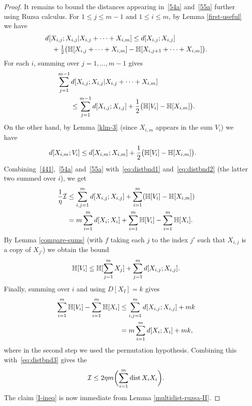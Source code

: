 \begin{proof}
It remains to bound the distances appearing in~\eqref{54a} and~\eqref{55a} further using Ruzsa calculus.
For $1 \leq j \leq m-1$ and $1 \leq i \leq m$, by Lemma \ref{first-useful} we have
\begin{align*} &d[ X_{i,j}; X_{i,j}| X_{i,j}+\cdots+X_{i,m}]
\leq d[X_{i,j}; X_{i,j}] \\
&\quad + \tfrac{1}{2} \bigl(\mathbb{H}[X_{i,j}+\cdots+X_{i,m}] - \mathbb{H}[X_{i,{j+1}}+\cdots+X_{i,m}]\bigr).
\end{align*}
For each $i$, summing over $j = 1,\dots, m-1$ gives
\begin{align}
  \nonumber
  &\sum_{j=1}^{m-1} d[X_{i,j}; X_{i,j}| X_{i,j}+\cdots+X_{i,m}] \\
  &\qquad \leq \sum_{j=1}^{m-1} d[X_{i,j}; X_{i,j}] + \frac12 \bigl( \mathbb{H}[V_i] - \mathbb{H}[X_{i,m}] \bigr).
  \label{eq:distbnd1}
\end{align}
On the other hand, by Lemma \ref{klm-3} (since $X_{i,m}$ appears in the sum $V_i$) we have
\begin{align}
  d[X_{i,m}; V_i]
  &\leq d[X_{i,m}; X_{i,m}] + \frac12 \bigl( \mathbb{H}[V_i] - \mathbb{H}[X_{i,m}] \bigr).
  \label{eq:distbnd2}
\end{align}
Combining~\eqref{441},~\eqref{54a} and~\eqref{55a} with~\eqref{eq:distbnd1} and~\eqref{eq:distbnd2} (the latter two summed over $i$), we get
\begin{align}
  \nonumber
  \frac1{\eta} {\mathcal I} &\leq \sum_{i,j=1}^m d[X_{i,j};X_{i,j}] + \sum_{i=1}^m (\mathbb{H}[V_i] - \mathbb{H}[X_{i,m}]) \\
      &= m \sum_{i=1}^m d[X_i; X_i] + \sum_{i=1}^m \mathbb{H}[V_i] - \sum_{i=1}^m \mathbb{H}[X_i].
      \label{eq:distbnd3}
\end{align}
By Lemma \ref{compare-sums} (with $f$ taking each $j$ to the index $j'$ such that $X_{i,j}$ is a copy of $X_{j'}$) we obtain the bound
\[
  \mathbb{H}[V_i] \leq \mathbb{H}[\sum_{j=1}^m X_j] + \sum_{j=1}^m d[X_{i,j}; X_{i,j}].
\]
Finally, summing over $i$ and using $D[X_I] = k$ gives
\begin{align*}
  \sum_{i=1}^m \mathbb{H}[V_i] - \sum_{i=1}^m \mathbb{H}[X_i] & \leq \sum_{i,j=1}^m d[X_{i,j}; X_{i,j}] + m k \\ & = m\sum_{i = 1}^m d[X_i; X_i] + mk,
\end{align*}
where in the second step we used the permutation hypothesis. Combining this with~\eqref{eq:distbnd3} gives the
$$
{\mathcal I} \leq 2\eta m \biggl( \sum_{i=1}^m \operatorname{dist}{X_i}{X_i} \biggr).$$
The claim \eqref{I-ineq} is now immediate from Lemma \ref{multidist-ruzsa-II}.
\end{proof}

